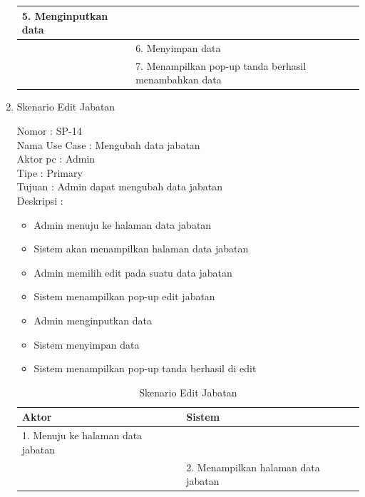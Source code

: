 \begin{enumerate}
\begin{table}
\begin{tabular}{ | l | p{65mm} |}
		\hline
		
		5.	Menginputkan data  & \\
		\hline
		
		& 6.	Menyimpan data \\
		\hline
		
		& 7.	Menampilkan pop-up tanda berhasil menambahkan data \\
		\hline
		
	\end{tabular}
\end{table}

\item Skenario Edit Jabatan

Nomor \kern 3.6pc : SP-14 \\
Nama Use Case : Mengubah data jabatan \\
Aktor  pc : Admin \\
Tipe \kern 4.6pc : Primary \\
Tujuan \kern 3.6pc : Admin dapat mengubah data jabatan \\
Deskripsi \kern 2.5pc : 

\begin{itemize}
	\item Admin menuju ke halaman data jabatan
	\item Sistem akan menampilkan halaman data jabatan
	\item Admin memilih edit pada suatu data jabatan
	\item Sistem menampilkan pop-up edit jabatan
	\item Admin menginputkan data
	\item Sistem menyimpan data
	\item Sistem menampilkan pop-up tanda berhasil di edit
	
\end{itemize}

\begin{table}
	\caption{Skenario Edit Jabatan}
	\centering
	\begin{tabular}{ | l | p{65mm} |}
		\hline 
		\textbf{Aktor} & \textbf{Sistem} \\
		\hline
		
		1.	Menuju ke halaman data jabatan &  \\
		
		\hline
		
		&  2.	Menampilkan halaman data jabatan \\
		
		\hline
		

\end{tabular}
\end{table}
\end{enumerate}
